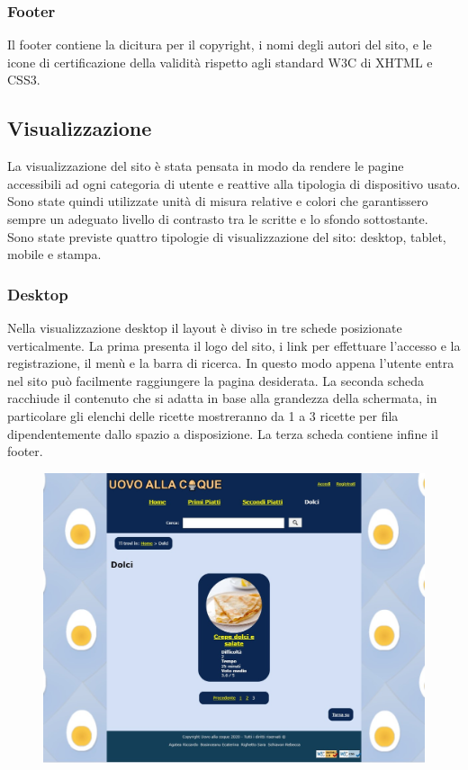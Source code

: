 \subsubsection{Footer}
\label{ssub:footer}
Il footer contiene la dicitura per il copyright, i nomi degli autori del sito, e le icone di certificazione della validità rispetto agli standard W3C di XHTML e CSS3.

\subsection{Visualizzazione} %
\label{sub:visualizzazione}
La visualizzazione del sito è stata pensata in modo da rendere le pagine accessibili ad ogni categoria di utente e reattive alla tipologia di dispositivo usato. Sono state quindi utilizzate unità di misura relative e colori che garantissero sempre un adeguato livello di contrasto tra le scritte e lo sfondo sottostante. \\
Sono state previste quattro tipologie di visualizzazione del sito: desktop, tablet, mobile e stampa.

\subsubsection{Desktop}
\label{ssub:desktop}
Nella visualizzazione desktop il layout è diviso in tre schede posizionate verticalmente. La prima presenta il logo del sito, i link per effettuare l'accesso e la registrazione, il menù e la barra di ricerca. In questo modo appena l'utente entra nel sito può facilmente raggiungere la pagina desiderata. La seconda scheda racchiude il contenuto che si adatta in base alla grandezza della schermata, in particolare gli elenchi delle ricette mostreranno da 1 a 3 ricette per fila dipendentemente dallo spazio a disposizione. La terza scheda contiene infine il footer. 
\begin{figure}[H]
	\centering
	\includegraphics[width=16cm]{img/progettazione/desktop.jpg}
\end{figure}

